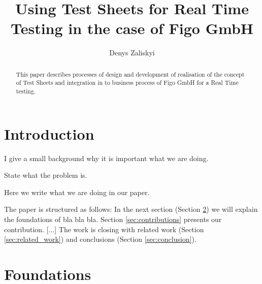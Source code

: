 \documentclass{llncs}
\begin{document}
\frontmatter          %
%
\pagestyle{headings}  %
%
\mainmatter              %
%
\title{Using Test Sheets for Real Time Testing in the case of Figo GmbH}
%
%
\author{Denys Zaliskyi}
%
%
%

\maketitle              %

\begin{abstract}
This paper describes processes of design and development of realisation of the concept of Test Sheets and integration in to business process of Figo GmbH for a Real Time testing.
\end{abstract}
%

\section{Introduction}

I give a small background why it is important what we are doing.

State what the problem is.

Here we write what we are doing in our paper.

The paper is structured as follows: In the next section (Section \ref{sec:foundations}) we will explain the foundations of bla bla bla. Section \ref{sec:contributions} presents our contribution. [...] The work is closing with related work (Section \ref{sec:related_work}) and conclusions (Section \ref{sec:conclusion}).

\section{Foundations}
\label{sec:foundations}
\end{document}
